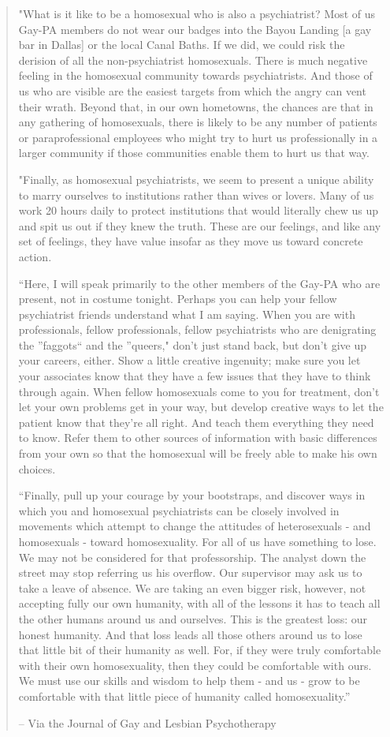 \begin{quote}
"What is it like to be a homosexual who is also a psychiatrist? Most of us Gay-PA members do not wear our badges into the Bayou Landing [a gay bar in Dallas] or the local Canal Baths. If we did, we could risk the derision of all the non-psychiatrist homosexuals. There is much negative feeling in the homosexual community towards psychiatrists. And those of us who are visible are the easiest targets from which the angry can vent their wrath. Beyond that, in our own hometowns, the chances are that in any gathering of homosexuals, there is likely to be any number of patients or paraprofessional employees who might try to hurt us professionally in a larger community if those communities enable them to hurt us that way.

"Finally, as homosexual psychiatrists, we seem to present a unique ability to marry ourselves to institutions rather than wives or lovers. Many of us work 20 hours daily to protect institutions that would literally chew us up and spit us out if they knew the truth. These are our feelings, and like any set of feelings, they have value insofar as they move us toward concrete action.

``Here, I will speak primarily to the other members of the Gay-PA who are present, not in costume tonight. Perhaps you can help your fellow psychiatrist friends understand what I am saying. When you are with professionals, fellow professionals, fellow psychiatrists who are denigrating the ''faggots`` and the ''queers," don't just stand back, but don't give up your careers, either. Show a little creative ingenuity; make sure you let your associates know that they have a few issues that they have to think through again. When fellow homosexuals come to you for treatment, don't let your own problems get in your way, but develop creative ways to let the patient know that they're all right. And teach them everything they need to know. Refer them to other sources of information with basic differences from your own so that the homosexual will be freely able to make his own choices.

``Finally, pull up your courage by your bootstraps, and discover ways in which you and homosexual psychiatrists can be closely involved in movements which attempt to change the attitudes of heterosexuals - and homosexuals - toward homosexuality. For all of us have something to lose. We may not be considered for that professorship. The analyst down the street may stop referring us his overflow. Our supervisor may ask us to take a leave of absence. We are taking an even bigger risk, however, not accepting fully our own humanity, with all of the lessons it has to teach all the other humans around us and ourselves. This is the greatest loss: our honest humanity. And that loss leads all those others around us to lose that little bit of their humanity as well. For, if they were truly comfortable with their own homosexuality, then they could be comfortable with ours. We must use our skills and wisdom to help them - and us - grow to be comfortable with that little piece of humanity called homosexuality.''

– Via the Journal of Gay and Lesbian Psychotherapy
\end{quote}

